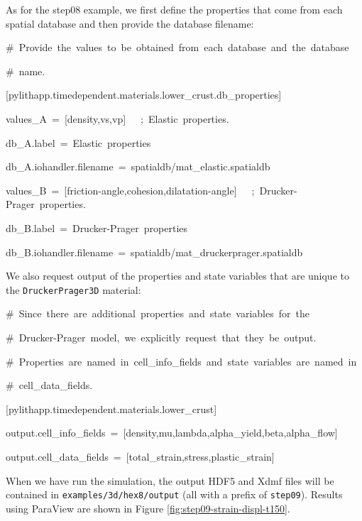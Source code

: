 As for the step08 example, we first define the properties that come
from each spatial database and then provide the database filename:
\begin{lyxcode}
\#~Provide~the~values~to~be~obtained~from~each~database~and~the~database

\#~name.

{[}pylithapp.timedependent.materials.lower\_crust.db\_properties{]}

values\_A~=~{[}density,vs,vp{]}~~~;~Elastic~properties.

db\_A.label~=~Elastic~properties

db\_A.iohandler.filename~=~spatialdb/mat\_elastic.spatialdb

values\_B~=~{[}friction-angle,cohesion,dilatation-angle{]}~~~;~Drucker-Prager~properties.

db\_B.label~=~Drucker-Prager~properties

db\_B.iohandler.filename~=~spatialdb/mat\_druckerprager.spatialdb
\end{lyxcode}
We also request output of the properties and state variables that
are unique to the \texttt{DruckerPrager3D} material:
\begin{lyxcode}
\#~Since~there~are~additional~properties~and~state~variables~for~the

\#~Drucker-Prager~model,~we~explicitly~request~that~they~be~output.

\#~Properties~are~named~in~cell\_info\_fields~and~state~variables~are~named~in

\#~cell\_data\_fields.

{[}pylithapp.timedependent.materials.lower\_crust{]}

output.cell\_info\_fields~=~{[}density,mu,lambda,alpha\_yield,beta,alpha\_flow{]}

output.cell\_data\_fields~=~{[}total\_strain,stress,plastic\_strain{]}
\end{lyxcode}
When we have run the simulation, the output HDF5 and Xdmf files will
be contained in \texttt{examples/3d/hex8/output} (all with a prefix
of \texttt{step09}). Results using ParaView are shown in Figure \ref{fig:step09-strain-displ-t150}.

